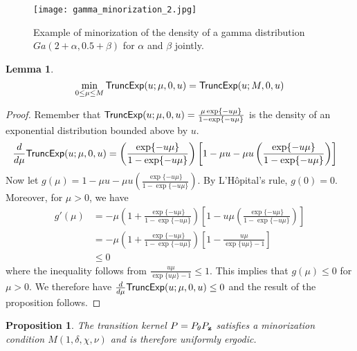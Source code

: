 \documentclass[11pt]{article}
\newtheorem{proposition}{Proposition}[section]
\newtheorem{lemma}{Lemma}[section]
\begin{document}
							
\begin{figure}	
	\centering
	\texttt{[image: gamma\_minorization\_2.jpg]}
	\caption{Example of minorization of the density of a gamma distribution $Ga(2+\alpha, 0.5+\beta)$ for $\alpha$ and $\beta$ jointly.}
	\label{fig:gam2}
\end{figure}

\begin{lemma}
	\label{pro:tru}
	$$\min_{0 \le \mu \le M} \textsf{TruncExp}(u; \mu, 0, u) = \textsf{TruncExp}(u; M, 0, u) $$
\end{lemma}
\begin{proof}
	Remember that $\textsf{TruncExp}(u; \mu, 0, u) = \frac{\mu \exp\{-u\mu\}}{1-\exp\{-u\mu\}}$ is the density of an exponential distribution bounded above by $u$.
	\begin{align*}
		\frac{d}{d\mu}\textsf{TruncExp}(u; \mu, 0, u)
		& = \left(\frac{\exp\{-u\mu\}}{1-\exp\{-u\mu\}} \right) \left[ 1-\mu u - \mu u \left(\frac{\exp\{-u\mu\}}{1-\exp\{-u\mu\}} \right) \right]
	\end{align*}
	Now let $g(\mu) = 1-\mu u - \mu u \left(\frac{\exp\{-u\mu\}}{1-\exp\{-u\mu\}} \right)$. By L'H\^{o}pital's rule, $g(0) = 0$. Moreover, for $\mu>0$, we have
	\begin{align*}
		g'(\mu)
		& = - \mu \left(1+\frac{\exp\{-u\mu\}}{1-\exp\{-u\mu\}} \right) \left[ 1-u\mu \left(\frac{\exp\{-u\mu\}}{1-\exp\{-u\mu\}} \right) \right]  \\
		& = - \mu \left(1+\frac{\exp\{-u\mu\}}{1-\exp\{-u\mu\}} \right) \left[ 1- \frac{u\mu}{\exp\{u\mu\}-1} \right] \\
		& \le 0
	\end{align*}
	where the inequality follows from $\frac{u\mu}{\exp\{u\mu\}-1}\le1$.
	This implies that $g(\mu) \le 0$ for $\mu>0$. We therefore have $\frac{d}{d\mu}\textsf{TruncExp}(u; \mu, 0, u) \le 0$ and the result of the proposition follows.
\end{proof}


\begin{proposition}
	\label{pro:uni}
	The transition kernel $P = P_{\theta}P_{\mathbf{z}}$ satisfies a minorization condition $M(1, \delta, \chi, \nu)$ and is therefore uniformly ergodic.
\end{proposition}
\end{document}
